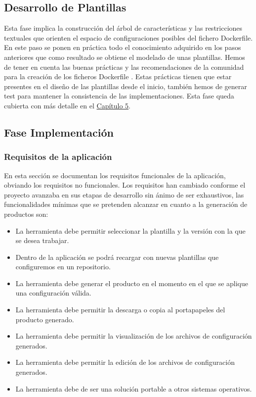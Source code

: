 \documentclass[12pt, a4paper, twoside]{article}
\begin{document}
\subsection{Desarrollo de Plantillas}
Esta fase implica la construcción del árbol de características y las restricciones textuales que orienten el espacio de 
configuraciones posibles del fichero Dockerfile. En este paso se ponen en práctica todo el conocimiento adquirido en los pasos anteriores que 
como resultado se obtiene el modelado de unas plantillas. Hemos de tener en cuenta las buenas prácticas y las recomendaciones de la comunidad para la creación de los ficheros Dockerfile \cite{dockerfile_concepts}. 
Estas prácticas tienen que estar presentes en el diseño de las plantillas desde el inicio, también hemos de generar test para mantener la consistencia de las implementaciones. 
Esta fase queda cubierta con más detalle en el \hyperref[sec:Modelado de las plantillas]{Capítulo 5}.


\subsection{Fase Implementación}
\subsubsection{Requisitos de la aplicación }
En esta sección se documentan los requisitos funcionales de la aplicación, obviando los requisitos no funcionales. Los requisitos han cambiado conforme el proyecto avanzaba en sus etapas de desarrollo
sin ánimo de ser exhaustivos, las funcionalidades mínimas que se pretenden alcanzar en cuanto a la generación de productos son:
\begin{itemize}
	\item La herramienta debe permitir seleccionar la plantilla y la versión con la que se desea trabajar. 
	\item Dentro de la aplicación se podrá recargar con nuevas plantillas que configuremos en un repositorio.
	\item La herramienta debe generar el producto en el momento en el que se aplique una configuración válida. 
	\item La herramienta debe permitir la descarga o copia al portapapeles del producto generado.
	\item La herramienta debe permitir la visualización de los archivos de configuración generados.
	\item La herramienta debe permitir la edición de los archivos de configuración generados.
	\item La herramienta debe de ser una solución portable a otros sistemas operativos.
\end{itemize}
\end{document}
